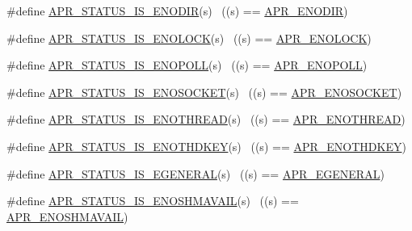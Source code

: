 \begin{DoxyCompactItemize}
\#define \hyperlink{group___a_p_r___s_t_a_t_u_s___i_s_ga419375c28976aa16d728515788a16659}{A\+P\+R\+\_\+\+S\+T\+A\+T\+U\+S\+\_\+\+I\+S\+\_\+\+E\+N\+O\+D\+IR}(s)              ~((s) == \hyperlink{group___a_p_r___error_ga9a8077e85b6241c1e91b69548395fc09}{A\+P\+R\+\_\+\+E\+N\+O\+D\+IR})
\item 
\#define \hyperlink{group___a_p_r___s_t_a_t_u_s___i_s_gac068eb34718b5c632298027136564561}{A\+P\+R\+\_\+\+S\+T\+A\+T\+U\+S\+\_\+\+I\+S\+\_\+\+E\+N\+O\+L\+O\+CK}(s)            ~((s) == \hyperlink{group___a_p_r___error_ga9c411624c42f7562a5c6c3461bdcb0ec}{A\+P\+R\+\_\+\+E\+N\+O\+L\+O\+CK})
\item 
\#define \hyperlink{group___a_p_r___s_t_a_t_u_s___i_s_ga0534b566ee6e101399266cf97b7c9f5d}{A\+P\+R\+\_\+\+S\+T\+A\+T\+U\+S\+\_\+\+I\+S\+\_\+\+E\+N\+O\+P\+O\+LL}(s)            ~((s) == \hyperlink{group___a_p_r___error_gaeff8d4ed7bf9b99cbe62a3e7068e85b7}{A\+P\+R\+\_\+\+E\+N\+O\+P\+O\+LL})
\item 
\#define \hyperlink{group___a_p_r___s_t_a_t_u_s___i_s_ga30609f2f19e2e90ba4e26991464adde7}{A\+P\+R\+\_\+\+S\+T\+A\+T\+U\+S\+\_\+\+I\+S\+\_\+\+E\+N\+O\+S\+O\+C\+K\+ET}(s)        ~((s) == \hyperlink{group___a_p_r___error_ga99e125e203a1d44f12bd88b41696716d}{A\+P\+R\+\_\+\+E\+N\+O\+S\+O\+C\+K\+ET})
\item 
\#define \hyperlink{group___a_p_r___s_t_a_t_u_s___i_s_ga5f187edda23f3d1cc9d3bddd5f7759d3}{A\+P\+R\+\_\+\+S\+T\+A\+T\+U\+S\+\_\+\+I\+S\+\_\+\+E\+N\+O\+T\+H\+R\+E\+AD}(s)        ~((s) == \hyperlink{group___a_p_r___error_ga7b43e1e075ff031e142aa809295ee441}{A\+P\+R\+\_\+\+E\+N\+O\+T\+H\+R\+E\+AD})
\item 
\#define \hyperlink{group___a_p_r___s_t_a_t_u_s___i_s_ga929b07c77d776fdc9a64ac238c3f5e5c}{A\+P\+R\+\_\+\+S\+T\+A\+T\+U\+S\+\_\+\+I\+S\+\_\+\+E\+N\+O\+T\+H\+D\+K\+EY}(s)        ~((s) == \hyperlink{group___a_p_r___error_ga29faf801fac647a14360e7493f7fd74e}{A\+P\+R\+\_\+\+E\+N\+O\+T\+H\+D\+K\+EY})
\item 
\#define \hyperlink{group___a_p_r___s_t_a_t_u_s___i_s_ga3aa77838dbb8f1b68f778b3cb4f1349d}{A\+P\+R\+\_\+\+S\+T\+A\+T\+U\+S\+\_\+\+I\+S\+\_\+\+E\+G\+E\+N\+E\+R\+AL}(s)          ~((s) == \hyperlink{group___a_p_r___error_ga18f5678bea0c2c704a2b6a186c9e158b}{A\+P\+R\+\_\+\+E\+G\+E\+N\+E\+R\+AL})
\item 
\#define \hyperlink{group___a_p_r___s_t_a_t_u_s___i_s_gaaf744d95d46d09dcfd9e6314ab9b5d97}{A\+P\+R\+\_\+\+S\+T\+A\+T\+U\+S\+\_\+\+I\+S\+\_\+\+E\+N\+O\+S\+H\+M\+A\+V\+A\+IL}(s)    ~((s) == \hyperlink{group___a_p_r___error_ga67516f4e87197490333480a8bbc78725}{A\+P\+R\+\_\+\+E\+N\+O\+S\+H\+M\+A\+V\+A\+IL})

\end{DoxyCompactItemize}
